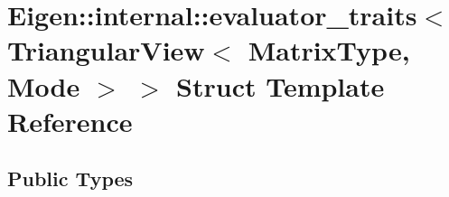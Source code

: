 \hypertarget{struct_eigen_1_1internal_1_1evaluator__traits_3_01_triangular_view_3_01_matrix_type_00_01_mode_01_4_01_4}{}\section{Eigen\+:\+:internal\+:\+:evaluator\+\_\+traits$<$ Triangular\+View$<$ Matrix\+Type, Mode $>$ $>$ Struct Template Reference}
\label{struct_eigen_1_1internal_1_1evaluator__traits_3_01_triangular_view_3_01_matrix_type_00_01_mode_01_4_01_4}
\subsection*{Public Types}

